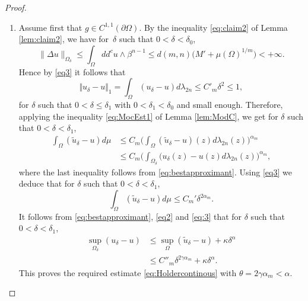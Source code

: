\begin{proof}
\begin{enumerate}
\item
Assume first that $g \in C^{1,1} (\partial \Omega)$.
By the inequality \eqref{eq:claim2} of Lemma \ref{lem:claim2}, we have for~$\delta$ such that $0 < \delta < \delta_0$,
\[
\|\Delta u\|_{\Omega_\delta} \leq \int_\Omega dd^c u \wedge \beta^{n - 1}\leq d(m,n) \bigl(M' + \mu (\Omega)^{1 \slash m}\bigr) < + \infty.
\]
Hence by \eqref{eq3} it follows that
\begin{equation*} \label{eq4}
\Vert {u}_{\delta} - u \Vert_1 = \int_{\Omega}({u}_{\delta}-u)d\lambda_{2n} \leq C'_m \delta^2 \leq 1,
\end{equation*}
for $\delta$ such that $0 < \delta \leq \delta_1$ with $0 < \delta_1 < \delta_0$ and small enough. Therefore, applying the inequality \eqref{eq:MocEst1} of Lemma \ref{lem:ModC}, we get for $\delta$ such that $0 < \delta < \delta_1$,
\begin{align*}
\int_{\Omega}(\tilde{u}_{\delta}-u)d\mu & \leq C_m \biggl(\int_{\Omega}(\tilde{u}_{\delta}-u)(z)d\lambda_{2 n} (z)\biggr)^{\alpha_m} \\
&\leq C_m\biggl(\int_{\Omega_{\delta}}({u}_{\delta}(z)-u(z)d\lambda_{2 n} (z)\biggr)^{\alpha_m},
\end{align*}
where the last inequality follows from \eqref{eq:bestapproximant}. Using \eqref{eq3} we deduce that for $\delta$ such that $0 < \delta < \delta_1$,
\begin{equation} \label{eq:3}
\int_{\Omega}(\tilde{u}_{\delta}-u)d\mu \leq C_m' \delta^{2 \alpha_m}.
\end{equation}
It follows from \eqref{eq:bestapproximant}, \eqref{eq2} and \eqref{eq:3} that for $\delta$ such that $0 < \delta < \delta_1$,
\begin{equation*} \label{eq:finalestimate}
\begin{split}
\sup_{\Omega_{\delta}}( {u}_{\delta}-u)&\leq\sup_{\Omega}(\tilde{u}_{\delta}-u)+ \kappa \delta^{\alpha} \\
&\leq  {C''_m} \delta^{2\gamma\alpha_m} + \kappa \delta^{\alpha}.
\end{split}
\end{equation*}
This proves the required estimate \eqref{eq:Holdercontinous} with $\theta = 2 \gamma \alpha_m < \alpha$.


\end{enumerate}
\end{proof}
